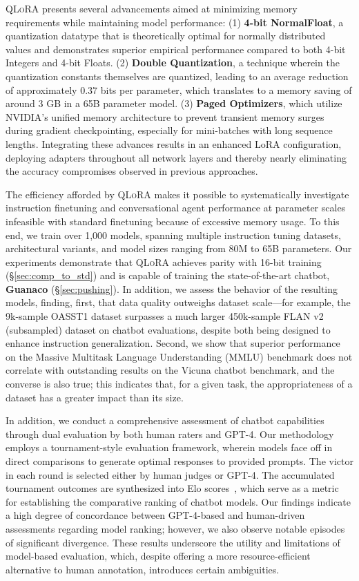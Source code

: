 \textsc{QLoRA} presents several advancements aimed at minimizing memory requirements while maintaining model performance: (1) \textbf{4-bit NormalFloat}, a quantization datatype that is theoretically optimal for normally distributed values and demonstrates superior empirical performance compared to both 4-bit Integers and 4-bit Floats. (2) \textbf{Double Quantization}, a technique wherein the quantization constants themselves are quantized, leading to an average reduction of approximately 0.37 bits per parameter, which translates to a memory saving of around 3 GB in a 65B parameter model. (3) \textbf{Paged Optimizers}, which utilize NVIDIA's unified memory architecture to prevent transient memory surges during gradient checkpointing, especially for mini-batches with long sequence lengths. Integrating these advances results in an enhanced LoRA configuration, deploying adapters throughout all network layers and thereby nearly eliminating the accuracy compromises observed in previous approaches.

The efficiency afforded by \textsc{QLoRA} makes it possible to systematically investigate instruction finetuning and conversational agent performance at parameter scales infeasible with standard finetuning because of excessive memory usage. To this end, we train over 1,000 models, spanning multiple instruction tuning datasets, architectural variants, and model sizes ranging from 80M to 65B parameters. Our experiments demonstrate that \textsc{QLoRA} achieves parity with 16-bit training (\S\ref{sec:comp_to_std}) and is capable of training the state-of-the-art chatbot, \textbf{Guanaco} (\S\ref{sec:pushing}). In addition, we assess the behavior of the resulting models, finding, first, that data quality outweighs dataset scale—for example, the 9k-sample OASST1 dataset surpasses a much larger 450k-sample FLAN v2 (subsampled) dataset on chatbot evaluations, despite both being designed to enhance instruction generalization. Second, we show that superior performance on the Massive Multitask Language Understanding (MMLU) benchmark does not correlate with outstanding results on the Vicuna chatbot benchmark, and the converse is also true; this indicates that, for a given task, the appropriateness of a dataset has a greater impact than its size.

In addition, we conduct a comprehensive assessment of chatbot capabilities through dual evaluation by both human raters and GPT-4. Our methodology employs a tournament-style evaluation framework, wherein models face off in direct comparisons to generate optimal responses to provided prompts. The victor in each round is selected either by human judges or GPT-4. The accumulated tournament outcomes are synthesized into Elo scores~\citep{elo1967proposed, elo1978rating}, which serve as a metric for establishing the comparative ranking of chatbot models. Our findings indicate a high degree of concordance between GPT-4-based and human-driven assessments regarding model ranking; however, we also observe notable episodes of significant divergence. These results underscore the utility and limitations of model-based evaluation, which, despite offering a more resource-efficient alternative to human annotation, introduces certain ambiguities.

